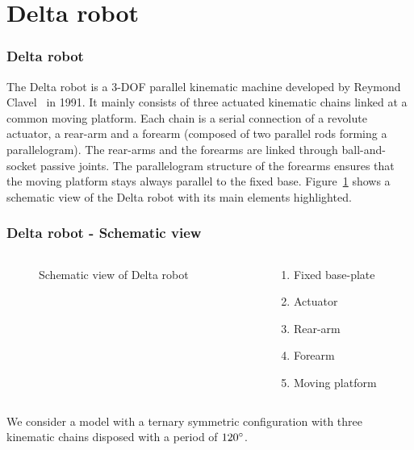 %
\section[Delta robot]{Delta robot}
\begin{frame}
\frametitle{Delta robot}
The Delta robot is a 3-DOF parallel kinematic machine developed by Reymond Clavel~ in 1991. It mainly consists of three actuated kinematic chains linked at a common moving platform. Each chain is a serial connection of a revolute actuator, a rear-arm and a forearm (composed of two parallel rods forming a parallelogram). The rear-arms and the forearms are linked through ball-and-socket passive joints. The parallelogram structure of the forearms ensures that the moving platform stays always parallel to the fixed base.
Figure~\ref{fig:Delta_schematic} shows a schematic view of the Delta robot with its main elements highlighted.
\end{frame}
%
\begin{frame}
\frametitle{Delta robot - Schematic view}
\begin{columns}
    \begin{column}{0.5\textwidth}
		\vspace*{.6 cm}
    	\begin{figure}
    		\caption{Schematic view of Delta robot}
    		\label{fig:Delta_schematic}
    	\end{figure}
    \end{column}
    \begin{column}{0.5\textwidth}
        \begin{enumerate}
        	\item Fixed base-plate
        	\item Actuator
        	\item Rear-arm
        	\item Forearm
        	\item Moving platform
        \end{enumerate}
    \end{column}
\end{columns}
We consider a model with a ternary symmetric configuration with three kinematic chains disposed with a period of $120\degree$.
\end{frame}
